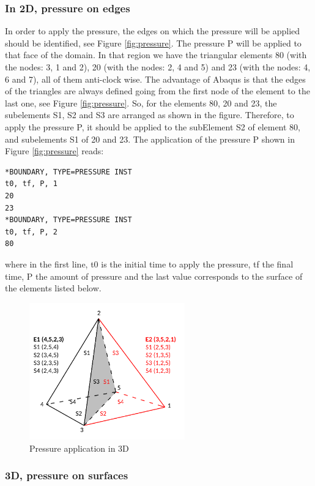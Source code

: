 \documentclass[oneside,11pt,times]{book}
\begin{document}
\subsubsection*{In 2D, pressure on edges}
In order to apply the pressure, the edges on which the pressure will be applied should be identified, see Figure \ref{fig:pressure}. The pressure P will be applied to that face of the domain. In that region we have the triangular elements 80 (with the nodes: 3, 1 and 2), 20 (with the nodes: 2, 4 and 5) and 23 (with the nodes: 4, 6 and 7), all of them anti-clock wise. The advantage of Abaqus is that the edges of the triangles are always defined going from the first node of the element to the last one, see Figure \ref{fig:pressure}. So, for the elements 80, 20 and 23, the subelements S1, S2 and S3 are arranged as shown in the figure. Therefore, to apply the pressure P, it should be applied to the subElement S2 of element 80, and subelements S1 of 20 and 23. The application of the pressure P shown in Figure \ref{fig:pressure} reads:
\begin{lstlisting}
*BOUNDARY, TYPE=PRESSURE INST
t0, tf, P, 1
20
23
*BOUNDARY, TYPE=PRESSURE INST
t0, tf, P, 2
80
\end{lstlisting}

 where in the first line, t0 is the initial time to apply the pressure, tf the final time, P the amount of pressure and the last value corresponds to the surface of the elements listed below.

 \begin{figure}[htb]
    \centering
    \includegraphics[width=0.6\textwidth]{imgs/UserManual/3D_pressure.pdf}
    \caption{Pressure application in 3D}
    \label{fig:pressure3D}
\end{figure}

 \subsubsection*{3D, pressure on surfaces}
\end{document}
